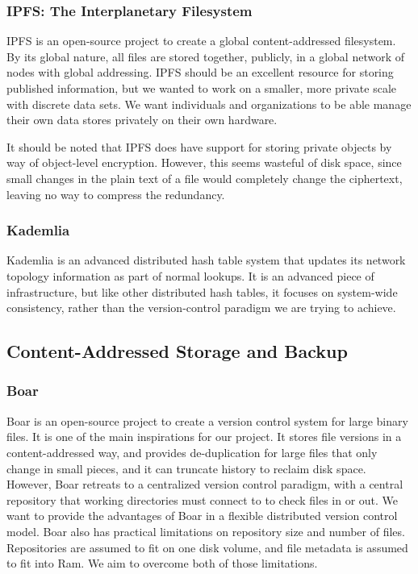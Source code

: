 \documentclass[a4paper]{article}
\begin{document}
\subsubsection{IPFS: The Interplanetary Filesystem}

IPFS \cite{ipfs_github_main} is an open-source project to create a global
content-addressed filesystem. By its global nature, all files are stored
together, publicly, in a global network of nodes with global addressing. IPFS
should be an excellent resource for storing published information, but we wanted
to work on a smaller, more private scale with discrete data sets. We want
individuals and organizations to be able manage their own data stores privately
on their own hardware.

It should be noted that IPFS does have support for storing private objects by
way of object-level encryption. However, this seems wasteful of disk space,
since small changes in the plain text of a file would completely change the
ciphertext, leaving no way to compress the redundancy.


\subsubsection{Kademlia}

Kademlia \cite{Maymounkov2002} is an advanced distributed hash table system that
updates its network topology information as part of normal lookups. It is an
advanced piece of infrastructure, but like other distributed hash tables, it
focuses on system-wide consistency, rather than the version-control paradigm we
are trying to achieve.


\subsection{Content-Addressed Storage and Backup}

\subsubsection{Boar}

Boar \cite{boar_homepage} is an open-source project to create a version control
system for large binary files. It is one of the main inspirations for our
project. It stores file versions in a content-addressed way, and provides
de-duplication for large files that only change in small pieces, and it can
truncate history to reclaim disk space. However, Boar retreats to a centralized
version control paradigm, with a central repository that working directories
must connect to to check files in or out. We want to provide the advantages of
Boar in a flexible distributed version control model. Boar also has practical
limitations on repository size and number of files. Repositories are assumed to
fit on one disk volume, and file metadata is assumed to fit into Ram. We aim to
overcome both of those limitations.
\end{document}
